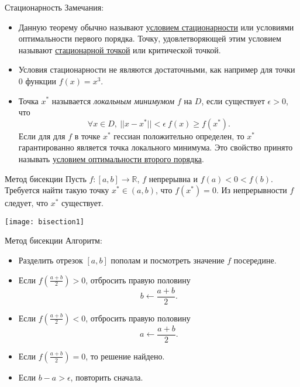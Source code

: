 \documentclass[10pt]{beamer}
\begin{document}
\begin{frame}{Стационарность}
Замечания:
\begin{itemize}[<+->]
\item Данную теорему обычно называют \underline{условием стационарности} или условиями оптимальности первого порядка. Точку, удовлетворяющей этим условием называют \underline{стационарной точкой} или критической точкой.
\item Условия стационарности не являются достаточными, как например для точки $0$ функции $f(x)=x^3$.
\item Точка $x^*$ называется \textit{локальным минимумом} $f$ на $D$, если существует $\epsilon>0$, что
$$
\forall x\in D,~||x-x^*||<\epsilon~f(x)\geq f(x^*).
$$
Если для для $f$ в точке $x^*$ гессиан положительно определен, то $x^*$ гарантированно является точка локального минимума. Это свойство принято называть \underline{условием оптимальности второго порядка}.
\end{itemize}
\end{frame}


\begin{frame}{Метод бисекции}
Пусть $f:[a,b]\rightarrow \mathbb{R}$, $f$ непрерывна и $f(a)<0<f(b)$. Требуется найти такую точку $x^*\in (a, b)$, что $f(x^*)=0$. Из непрерывности $f$ следует, что $x^*$ существует.
\begin{center}
\texttt{[image: bisection1]}
\end{center}

\end{frame}

\begin{frame}{Метод бисекции}
Алгоритм:
\begin{itemize}
\item Разделить отрезок $[a,b]$ пополам и посмотреть значение $f$ посередине.
\item Если $f\left(\frac{a+b}{2}\right)>0$, отбросить правую половину
$$
b\leftarrow \frac{a+b}{2}.
$$
\item Если $f\left(\frac{a+b}{2}\right)<0$, отбросить правую половину
$$
a\leftarrow \frac{a+b}{2}.
$$
\item Если $f\left(\frac{a+b}{2}\right)=0$, то решение найдено.
\item Если $b-a>\epsilon$, повторить сначала.
\end{itemize}

\end{frame}
\end{document}
